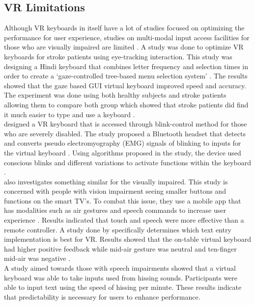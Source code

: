 \documentclass{vgtc}                          %
\begin{document}
\subsection{VR Limitations}

Although VR keyboards in itself have a lot of studies focused on optimizing the performance for user experience, studies on multi-modal input access facilities for those who are visually impaired are limited \cite{12}. A study was done to optimize VR keyboards for stroke patients using eye-tracking interaction. This study was designing a Hindi keyboard that combines letter frequency and selection times in order to create a ‘gaze-controlled tree-based menu selection system’ \cite{12}. The results showed that the gaze based GUI virtual keyboard improved speed and accuracy. The experiment was done using both healthy subjects and stroke patients allowing them to compare both group which showed that stroke patients did find it much easier to type and use a keyboard  \cite{12} .\\[1em]
 \cite{11}  designed a VR keyboard that is accessed through blink-control method for those who are severely disabled. The study proposed a Bluetooth headset that detects and converts pseudo electromyography (EMG) signals of blinking to inputs for the virtual keyboard  \cite{11}. Using algorithms proposed in the study, the device used conscious blinks and different variations to activate functions within the keyboard  \cite{11}.  \\[1em]
 \cite{18}  also investigates something similar for the visually impaired. This study is concerned with people with vision impairment seeing smaller buttons and functions on the smart TV’s. To combat this issue, they use a mobile app that has modalities such as air gestures and speech commands to increase user experience \cite{18}. Results indicated that touch and speech were more effective than a remote controller\cite{18}. A study done by \cite{15} specifically determines which text entry implementation is best for VR. Results showed that the on-table virtual keyboard had higher positive feedback while mid-air gesture was neutral and ten-finger mid-air was negative \cite{18}.  \\[1em]
A study aimed towards those with speech impairments showed that a virtual keyboard was able to take inputs used from hissing sounds\cite{26}. Participants were able to input text using the speed of hissing per minute\cite{26}. These results indicate that predictability is necessary for users to enhance performance\cite{26}. 
\end{document}

